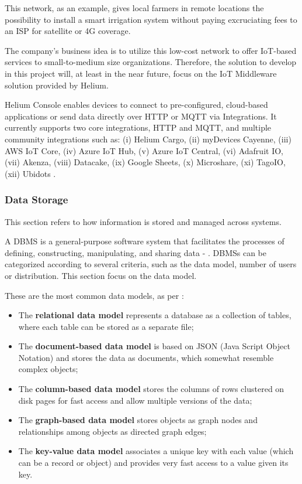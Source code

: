 This network, as an example, gives local farmers in remote locations the possibility to install a smart irrigation system without paying excruciating fees to an \gls{ISP} for satellite or 4G coverage.

The company's business idea is to utilize this low-cost network to offer \gls{IoT}-based services to small-to-medium size organizations.
Therefore, the solution to develop in this project will, at least in the near future, focus on the \gls{IoT} Middleware solution provided by Helium.

Helium Console enables devices to connect to pre-configured, cloud-based applications or send data directly over HTTP or MQTT via Integrations.
It currently supports two core integrations, HTTP and \gls{MQTT}, and multiple community integrations such as: (i) Helium Cargo, (ii) myDevices Cayenne, (iii) AWS IoT Core, (iv) Azure IoT Hub, (v) Azure IoT Central, (vi) Adafruit IO, (vii) Akenza, (viii) Datacake, (ix) Google Sheets, (x) Microshare, (xi) TagoIO, (xii) Ubidots \parencite{helium-integrations}. 

\subsubsection{Data Storage}
\label{subsubsec:stateofart:arch:infra:store}

This section refers to how information is stored and managed across systems.

A \gls{DBMS} is a general-purpose software system that facilitates the processes of defining, constructing, manipulating, and sharing data - . \gls{DBMS}s can be categorized according to several criteria, such as the data model, number of users or distribution. This section focus on the data model.

These are the most common data models, as per \cite{elmasri2000fundamentals}:

\begin{itemize}
    \item The \textbf{relational data model} represents a database as a collection of tables, where each table can be stored as a separate file;
    \item The \textbf{document-based data model} is based on JSON (Java Script Object Notation) and stores the data as documents, which somewhat resemble complex objects;
    \item The \textbf{column-based data model} stores the columns of rows clustered on disk pages for fast access and allow multiple versions of the data;
    \item The \textbf{graph-based data model} stores objects as graph nodes and relationships among objects as directed graph edges;
    \item The \textbf{key-value data model} associates a unique key with each value (which can be a record or object) and provides very fast access to a value given its key.
\end{itemize}

